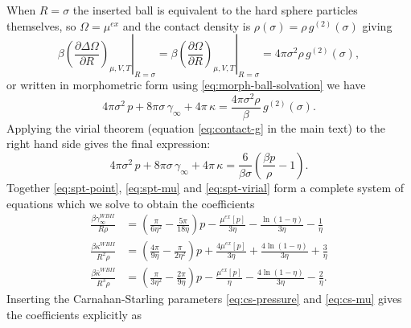 \documentclass[12pt]{report}
\begin{document}
When $R = \sigma$ the inserted ball is equivalent to the hard sphere particles themselves, so $\Omega = \mu^{ex}$ and the contact density is $\rho(\sigma) = \rho \, g^{(2)}(\sigma)$ giving
\begin{equation}\label{eq:spt-contact-density}
  \left. \beta \left( \frac{\partial \Delta \Omega}{\partial R} \right)_{\mu,V,T}
  \right|_{R = \sigma}
  =
  \left. \beta \left( \frac{\partial \Omega}{\partial R} \right)_{\mu,V,T}
  \right|_{R = \sigma}
  =
  4\pi \sigma^2 \rho \, g^{(2)}(\sigma),
\end{equation}
or written in morphometric form using \eqref{eq:morph-ball-solvation} we have
\begin{equation}
  4\pi \sigma^2 \, p +
  8\pi \sigma \, \gamma_\infty +
  4\pi \, \kappa =
  \frac{4\pi \sigma^2 \rho}{\beta} \, g^{(2)}(\sigma).
\end{equation}
Applying the virial theorem (equation \eqref{eq:contact-g} in the main text) to the right hand side gives the final expression:
\begin{equation}\label{eq:spt-virial}
  4\pi \sigma^2 \, p +
  8\pi \sigma \, \gamma_\infty +
  4\pi \, \kappa =
  \frac{6}{\beta\sigma} \left( \frac{\beta p}{\rho} - 1 \right).
\end{equation}
Together \eqref{eq:spt-point}, \eqref{eq:spt-mu} and \eqref{eq:spt-virial} form a complete system of equations which we solve to obtain the coefficients
\begin{subequations}
  \begin{align}
    \frac{\beta \gamma_\infty^{WBII}}{R \rho} &=
    \left(\frac{\pi}{6\eta^2} - \frac{5\pi}{18\eta}\right) p -
    \frac{\mu^{ex}[p]}{3\eta} -
    \frac{\ln{(1-\eta)}}{3\eta} -
    \frac{1}{\eta}
    \label{eq:spt-gamma}
    \\
    \frac{\beta \kappa^{WBII}}{R^2\rho} &=
    \left( \frac{4\pi}{9\eta} - \frac{\pi}{2\eta^2} \right) p +
    \frac{4\mu^{ex}[p]}{3\eta} + \frac{4\ln{(1-\eta)}}{3\eta} + \frac{3}{\eta}
    \\
    \frac{\beta \overline{\kappa}^{WBII}}{R^3\rho} &=
    \left( \frac{\pi}{3\eta^2} - \frac{2\pi}{9\eta} \right) p -
    \frac{\mu^{ex}[p]}{\eta} - \frac{4\ln{(1-\eta)}}{3\eta} - \frac{2}{\eta}.
  \end{align}
\end{subequations}
Inserting the Carnahan-Starling parameters \eqref{eq:cs-pressure} and \eqref{eq:cs-mu} gives the coefficients explicitly as
\end{document}
